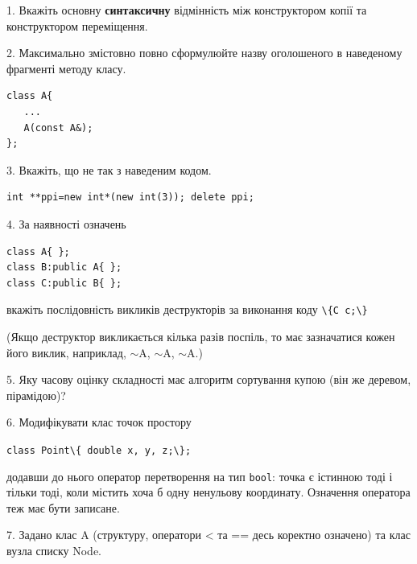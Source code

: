 \documentclass[12pt, ukrainian]{article}
\def\code#1{\Verb!#1!}
\begin{document}
{%
1. Вкажіть основну \textbf{синтаксичну} відмінність між конструктором копії та конструктором переміщення.%
\par
\vspace{2mm}
2. Максимально змістовно повно сформулюйте назву оголошеного в наведеному фрагменті методу класу.
\vspace{-3mm}
\begin{verbatim}class A{
   ...
   A(const A&);
};\end{verbatim}
\vspace{-3mm}
\par
\vspace{2mm}
3. Вкажіть, що не так з наведеним кодом.
\vspace{-3mm}
\begin{verbatim}int **ppi=new int*(new int(3)); delete ppi;\end{verbatim}
\vspace{-3mm}
\par
\vspace{2mm}
4. За наявності означень
\vspace{-3mm}
\begin{verbatim}
class A{ };
class B:public A{ };
class C:public B{ };\end{verbatim}
\vspace{-3mm}
вкажіть послідовність викликів деструкторів за виконання коду \code{\{C c;\}} 

(Якщо деструктор викликається кілька разів поспіль, то має зазначатися кожен його виклик, наприклад, $\sim$A, $\sim$A, $\sim$A.)

\vspace{2mm}
5. Яку часову оцінку складності має алгоритм сортування купою (він же деревом, пірамідою)?
\par
\vspace{2mm}
6. Модифікувати клас точок простору 

\qquad\code{class Point\{ double x, y, z;\};}


додавши до нього оператор перетворення на тип \code{bool}: точка є істинною тоді і тільки тоді, коли містить хоча б одну ненульову координату. Означення оператора теж має бути записане.%
\par
\vspace{2mm}
7. 
Задано клас A (структуру, оператори < та == десь коректно означено) та клас вузла списку Node.

}
\end{document}
